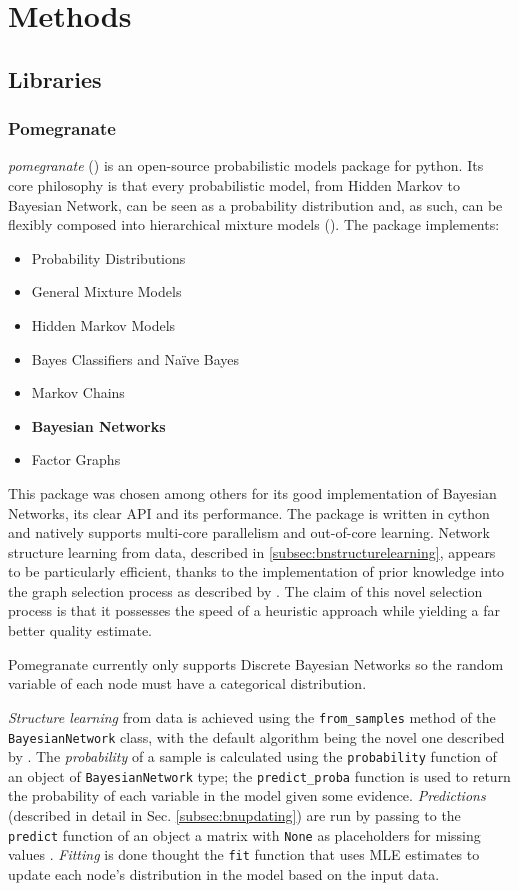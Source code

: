 
\section{Methods} 
\subsection{Libraries}\label{subsec:libraries}
\subsubsection{Pomegranate}
\textit{pomegranate} (\cite{pomegranate}) is an open-source probabilistic models package for python.
Its core philosophy is that every probabilistic model, from Hidden Markov to Bayesian Network, can be seen as a probability distribution and, as such, can be flexibly composed into hierarchical mixture models (\cite{Schreiber2017}).
The package implements:
\begin{itemize}
	\item Probability Distributions
	\item General Mixture Models
	\item Hidden Markov Models
	\item Bayes Classifiers and Na{\"i}ve Bayes
	\item Markov Chains
	\item \textbf{Bayesian Networks}
	\item Factor Graphs
\end{itemize} 

This package was chosen among others for its good implementation of Bayesian Networks, its clear API and its performance.
The package is written in cython and natively supports multi-core parallelism and out-of-core learning.
Network structure learning from data, described in \ref{subsec:bnstructurelearning}, appears to be particularly efficient, thanks to the implementation of prior knowledge into the graph selection process as described by \cite{schreiber_noble_2017}.
The claim of this novel selection process is that it possesses the speed of a heuristic approach while yielding a far better quality estimate.

Pomegranate currently only supports Discrete Bayesian Networks so the random variable of each node must have a categorical distribution.

\textit{Structure learning} from data is achieved using the \texttt{from\_samples} method of the \texttt{BayesianNetwork} class, with the default algorithm being the novel one described by \cite{schreiber_noble_2017}.
The \textit{probability} of a sample is calculated using the \texttt{probability} function of an object of \texttt{BayesianNetwork} type; the \texttt{predict\_proba} function is used to return the probability of each variable in the model given some evidence.
\textit{Predictions} (described in detail in Sec. \ref{subsec:bnupdating}) are run by passing to the \texttt{predict} function of an object a matrix with \texttt{None} as placeholders for missing values .
\textit{Fitting} is done thought the \texttt{fit} function that uses MLE estimates to update each node's distribution in the model based on the input data.

